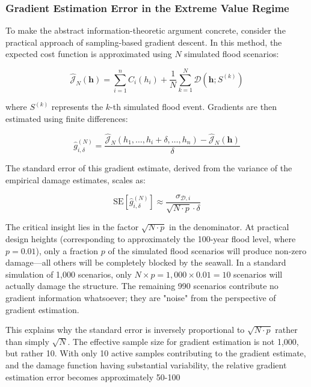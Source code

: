 \documentclass[review]{elsarticle}
\begin{document}
\subsubsection{Gradient Estimation Error in the Extreme Value Regime}

To make the abstract information-theoretic argument concrete, consider the practical approach of sampling-based gradient descent. In this method, the expected cost function is approximated using $N$ simulated flood scenarios:

\begin{equation}
\hat{\mathcal{J}}_N(\mathbf{h}) = \sum_{i=1}^{n} C_i(h_i) + \frac{1}{N} \sum_{k=1}^{N} \mathcal{D}(\mathbf{h}; S^{(k)})
\label{eq:empirical_cost}
\end{equation}

where $S^{(k)}$ represents the $k$-th simulated flood event. Gradients are then estimated using finite differences:

\begin{equation}
\hat{g}_{i,\delta}^{(N)} = \frac{\hat{\mathcal{J}}_N(h_1, \ldots, h_i + \delta, \ldots, h_n) - \hat{\mathcal{J}}_N(\mathbf{h})}{\delta}
\label{eq:finite_diff}
\end{equation}

The standard error of this gradient estimate, derived from the variance of the empirical damage estimates, scales as:

\begin{equation}
\text{SE}[\hat{g}_{i,\delta}^{(N)}] \approx \frac{\sigma_{\mathcal{D},i}}{\sqrt{N \cdot p} \cdot \delta}
\label{eq:gradient_se}
\end{equation}

The critical insight lies in the factor $\sqrt{N \cdot p}$ in the denominator. At practical design heights (corresponding to approximately the 100-year flood level, where $p = 0.01$), only a fraction $p$ of the simulated flood scenarios will produce non-zero damage---all others will be completely blocked by the seawall. In a standard simulation of 1,000 scenarios, only $N \times p = 1,000 \times 0.01 = 10$ scenarios will actually damage the structure. The remaining 990 scenarios contribute no gradient information whatsoever; they are "noise" from the perspective of gradient estimation.

This explains why the standard error is inversely proportional to $\sqrt{N \cdot p}$ rather than simply $\sqrt{N}$. The effective sample size for gradient estimation is not 1,000, but rather 10. With only 10 active samples contributing to the gradient estimate, and the damage function having substantial variability, the relative gradient estimation error becomes approximately 50-100%
\end{document}

